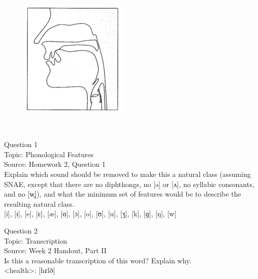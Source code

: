 \documentclass[12pt]{article}
\begin{document}
\begin{figure}[H]
\includegraphics{../images/sagittal_t.png}
\end{figure}

\newpage

\begin{center}
\textbf{{\color{red}{\HUGE END OF EXAM}}}\\

\end{center}
\newpage

\begin{center}
\textbf{{\color{blue}{\HUGE START OF EXAM\\}}}

\textbf{{\color{blue}{\HUGE Student ID: 80815\\}}}

\textbf{{\color{blue}{\HUGE 4:50\\}}}

\end{center}
\newpage

{\large Question 1}\\

Topic: Phonological Features\\
Source: Homework 2, Question 1\\

Explain which sound should be removed to make this a natural class (assuming SNAE, except that there are no diphthongs, no [ə] or [ʌ], no syllabic consonants, and no [w̥]), and what the minimum set of features would be to describe the resulting natural class.\\

{[i]}, {[ɪ]}, {[e]}, {[ɛ]}, {[æ]}, {[ɑ]}, {[ɔ]}, {[o]}, {[ʊ]}, {[u]}, {[ʒ]}, {[k]}, {[ɡ]}, {[ŋ]}, {[w]}


\newpage

{\large Question 2}\\

Topic: Transcription\\
Source: Week 2 Handout, Part II\\

Is this a reasonable transcription of this word? Explain why.\\

<health>: {[hɛlð]}


\newpage

\begin{center}
\textbf{{\color{red}{\HUGE END OF EXAM}}}\\

\end{center}
\newpage
\end{document}
